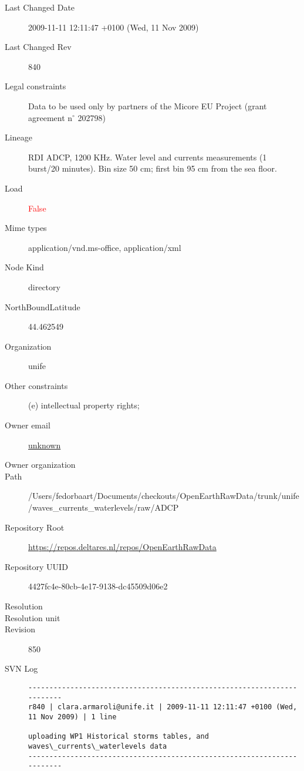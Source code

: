 \documentclass[9]{report}
\begin{document}
\begin{description}
  \item[Last Changed Date] 2009-11-11 12:11:47 +0100 (Wed, 11 Nov 2009)
  \item[Last Changed Rev] 840
  \item[Legal constraints] Data to be used only by partners of the Micore EU Project (grant agreement n\mbox{$^\circ$} 202798)
  \item[Lineage] RDI ADCP, 1200 KHz. Water level and currents measurements (1 burst/20 minutes). Bin size 50 cm; first bin 95 cm from the sea floor.
  \item[Load] \textcolor{red}{False}
  \item[Mime types] application/vnd.ms-office, application/xml
  \item[Node Kind] directory
  \item[NorthBoundLatitude] 44.462549
  \item[Organization] unife
  \item[Other constraints] (e) intellectual property rights;
  \item[Owner email] \href{mailto:unknown}{unknown}
  \item[Owner organization] 
  \item[Path] /Users/fedorbaart/Documents/checkouts/OpenEarthRawData/trunk/unife/waves\_currents\_waterlevels/raw/ADCP
  \item[Repository Root] \href{https://repos.deltares.nl/repos/OpenEarthRawData}{https://repos.deltares.nl/repos/OpenEarthRawData}
  \item[Repository UUID] 4427fc4e-80cb-4e17-9138-dc45509d06e2
  \item[Resolution] 
  \item[Resolution unit] 
  \item[Revision] 850
  \item[SVN Log] \begin{verbatim}
------------------------------------------------------------------------
r840 | clara.armaroli@unife.it | 2009-11-11 12:11:47 +0100 (Wed, 11 Nov 2009) | 1 line

uploading WP1 Historical storms tables, and waves\_currents\_waterlevels data
------------------------------------------------------------------------


\end{verbatim}
\end{description}
\end{document}
